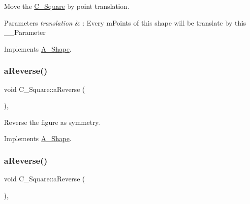 Move the \hyperlink{classC__Square}{C\+\_\+\+Square} by point translation. 


\begin{DoxyParams}{Parameters}
{\em translation} & \+: Every m\+Points of this shape will be translate by this \+\_\+\+\_\+\+Parameter \\
\hline
\end{DoxyParams}


Implements \hyperlink{classA__Shape_ab284298db1b557ccfa7ba6de7a5fee2c}{A\+\_\+\+Shape}.

\mbox{\label{classC__Square_a961d1f5c49a45459668744d459863bd2}} 
\subsubsection{\texorpdfstring{a\+Reverse()}{aReverse()}\hspace{0.1cm}{\footnotesize\ttfamily [1/2]}}
{\footnotesize\ttfamily void C\+\_\+\+Square\+::a\+Reverse (\begin{DoxyParamCaption}{ }\end{DoxyParamCaption})\hspace{0.3cm}{\ttfamily [override]}, {\ttfamily [virtual]}}



Reverse the figure as symmetry. 



Implements \hyperlink{classA__Shape_afe2c7969d647f6358da13879a7534ecb}{A\+\_\+\+Shape}.

\mbox{\label{classC__Square_a961d1f5c49a45459668744d459863bd2}} 
\subsubsection{\texorpdfstring{a\+Reverse()}{aReverse()}\hspace{0.1cm}{\footnotesize\ttfamily [2/2]}}
{\footnotesize\ttfamily void C\+\_\+\+Square\+::a\+Reverse (\begin{DoxyParamCaption}{ }\end{DoxyParamCaption})\hspace{0.3cm}{\ttfamily [override]}, {\ttfamily [virtual]}}




